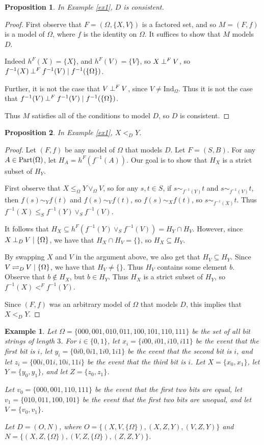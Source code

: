 \documentclass[authordate,onecolumn]{miri-tech-article}
\newtheorem{example}{Example}
\newtheorem{proposition}{Proposition}
\begin{document}
\begin{proposition}
In Example \ref{ex1}, $D$ is consistent.
\end{proposition}
\begin{proof}
First observe that $F=(\Omega,\{X,V\})$ is a factored set, and so $M=(F,f)$ is a model of $\Omega$, where $f$ is the identity on $\Omega$. It suffices to show that $M$ models $D$.

Indeed $h^F(X)=\{X\}$, and $h^F(V)=\{V\}$, so $\ortho{X}{V}$, so $\co{f^{-1}(X)}{f^{-1}(V)}{f^{-1}(\{\Omega\})}$. 

Further, it is not the case that $\ortho{V}{V}$, since $V\neq \text{Ind}_\Omega$. Thus it is not the case that $\co{f^{-1}(V)}{f^{-1}(V)}{f^{-1}(\{\Omega\})}$.

Thus $M$ satisfies all of the conditions to model $D$, so $D$ is consistent.
\end{proof}
\begin{proposition}\label{exth1}
In Example \ref{ex1}, $X<_D Y$.
\end{proposition}
\begin{proof}
Let $(F,f)$ be any model of $\Omega$ that models $D$. Let $F=(S,B)$. For any $A\in\parts[\Omega]$, let $H_A=h^F(f^{-1}(A))$. Our goal is to show that $H_X$ is a strict subset of $H_Y$.

First observe that $X\leq_\Omega Y\vee_\Omega V$, so for any $s,t\in S$, if $s\sim_{f^{-1}(Y)}t$ and $s\sim_{f^{-1}(V)}t$, then $f(s)\sim_Y f(t)$ and $f(s)\sim_V f(t)$, so $f(s)\sim_X f(t)$, so $s\sim_{f^{-1}(X)}t$. Thus $f^{-1}(X)\leq_S f^{-1}(Y) \vee_S f^{-1}(V)$.

It follows that $H_X\subseteq h^F(f^{-1}(Y) \vee_S f^{-1}(V))= H_Y\cap H_V$. However, since $\cod{X}{V}{\{\Omega\}}$, we have that $H_X\cap H_V=\{\}$, so 
$H_X\subseteq H_Y$.

By swapping $X$ and $V$ in the argument above, we also get that $H_V\subseteq H_Y$. Since $\ncod{V}{V}{\{\Omega\}}$, we have that $H_V\neq \{\}$. Thus $H_V$ contains some element $b$. Observe that $b\notin H_X$, but $b\in H_Y$. Thus $H_X$ is a strict subset of $H_Y$, so $f^{-1}(X)<^F f^{-1}(Y)$.

Since $(F,f)$ was an arbitrary model of $\Omega$ that models $D$, this implies that $X<_D Y$.
\end{proof}
\begin{example}\label{ex2}
Let $\Omega=\{000,001,010,011,100,101,110,111\}$ be the set of all bit strings of length $3$. For $i\in\{0,1\}$, let $x_i=\{i00,i01,i10,i11\}$ be the event that the first bit is $i$, let $y_i=\{0i0,0i1,1i0,1i1\}$ be the event that the second bit is $i$, and let $z_i=\{00i,01i,10i,11i\}$ be the event that the third bit is $i$. Let $X=\{x_0,x_1\}$, let $Y=\{y_0,y_1\}$, and let $Z=\{z_0,z_1\}$. 

Let $v_0=\{000,001,110,111\}$ be the event that the first two bits are equal, let $v_1=\{010,011,100,101\}$ be the event that the first two bits are unequal, and let $V=\{v_0,v_1\}$. 

Let $D=(O,N)$, where $O=\{(X,V,\{\Omega\}),(X,Z,Y),(V,Z,Y)\}$ and $N=\{(X,Z,\{\Omega\}),(V,Z,\{\Omega\}),(Z,Z,Y)\}$.
\end{example}
\end{document}
